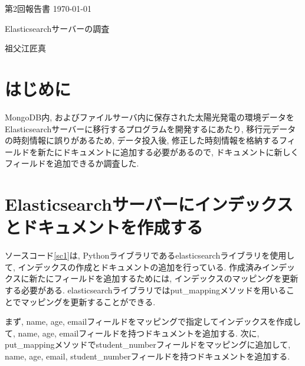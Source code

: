 \documentclass[a4j,12pt,]{jarticle}
\begin{document}
{\noindent\small 第2回報告書 \hfill\today}
\begin{center}
  {\Large Elasticsearchサーバーの調査}
\end{center}
\begin{flushright}
  祖父江匠真 \\
\end{flushright}

\section{はじめに}
MongoDB内, およびファイルサーバ内に保存された太陽光発電の環境データをElasticsearchサーバーに移行するプログラムを開発するにあたり, 移行元データの時刻情報に誤りがあるため, データ投入後, 修正した時刻情報を格納するフィールドを新たにドキュメントに追加する必要があるので, ドキュメントに新しくフィールドを追加できるか調査した.

\section{Elasticsearchサーバーにインデックスとドキュメントを作成する}

ソースコード\ref{sc1}は, Pythonライブラリであるelasticsearchライブラリを使用して, インデックスの作成とドキュメントの追加を行っている.
作成済みインデックスに新たにフィールドを追加するためには, インデックスのマッピングを更新する必要がある.
elasticsearchライブラリではput\_mappingメソッドを用いることでマッピングを更新することができる.

まず, name, age, emailフィールドをマッピングで指定してインデックスを作成して, name, age, emailフィールドを持つドキュメントを追加する.
次に, put\_mappingメソッドでstudent\_numberフィールドをマッピングに追加して, name, age, email, student\_numberフィールドを持つドキュメントを追加する.
\end{document}
